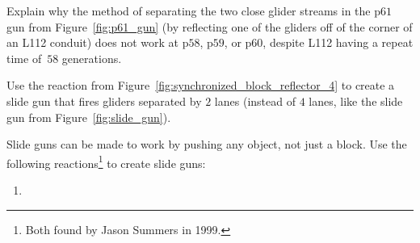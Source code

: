 \begin{multicols}{2}
\mfilbreak


\begin{problem}\label{exer:p61_gun_reflection_no_60}
	Explain why the method of separating the two close glider streams in the p$61$ gun from Figure~\ref{fig:p61_gun} (by reflecting one of the gliders off of the corner of an L112 conduit) does not work at p$58$, p$59$, or p$60$, despite L112 having a repeat time of~$58$ generations.
\end{problem}


\mfilbreak


\begin{problem}\label{exer:2_lane_slide_gun}
	Use the reaction from Figure~\ref{fig:synchronized_block_reflector_4} to create a slide gun that fires gliders separated by $2$ lanes (instead of $4$ lanes, like the slide gun from Figure~\ref{fig:slide_gun}).
\end{problem}


\mfilbreak


\begin{problem}\label{exer:slide_gun_honey_farm}
	Slide guns can be made to work by pushing any object, not just a block. Use the following reactions\footnote{Both found by Jason Summers in 1999.} to create slide guns:\\[0.05cm]
	
	\begin{enumerate}[label=\bf\color{ocre}(\alph*)]
		\item {}\\[0.1cm]
		

\end{enumerate}
\end{problem}
\end{multicols}
